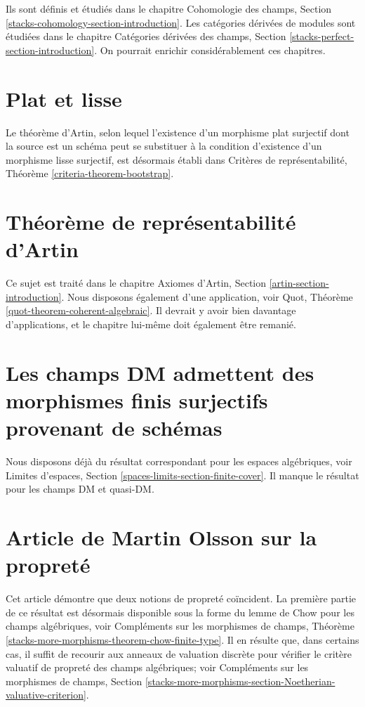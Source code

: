 \noindent
Ils sont définis et étudiés dans le chapitre
Cohomologie des champs, Section \ref{stacks-cohomology-section-introduction}.
Les catégories dérivées de modules sont étudiées dans le chapitre
Catégories dérivées des champs, Section \ref{stacks-perfect-section-introduction}.
On pourrait enrichir considérablement ces chapitres.



\section{Plat et lisse}
\label{section-flat-smooth}

\noindent
Le théorème d'Artin, selon lequel l'existence d'un morphisme plat surjectif dont la source est un schéma
peut se substituer à la condition d'existence d'un morphisme lisse surjectif, est désormais établi dans
Critères de représentabilité, Théorème \ref{criteria-theorem-bootstrap}.


\section{Théorème de représentabilité d'Artin}
\label{section-representability}

\noindent
Ce sujet est traité dans le chapitre
Axiomes d'Artin, Section \ref{artin-section-introduction}.
Nous disposons également d'une application, voir
Quot, Théorème \ref{quot-theorem-coherent-algebraic}.
Il devrait y avoir bien davantage d'applications, et le chapitre
lui-même doit également être remanié.


\section{Les champs DM admettent des morphismes finis surjectifs provenant de schémas}
\label{section-dm-finite-cover}

\noindent
Nous disposons déjà du résultat correspondant pour les espaces algébriques, voir
Limites d'espaces, Section \ref{spaces-limits-section-finite-cover}.
Il manque le résultat pour les champs DM et quasi-DM.


\section{Article de Martin Olsson sur la propreté}
\label{section-proper-parametrization}

\noindent
Cet article démontre que deux notions de propreté coïncident. La première partie de ce résultat
est désormais disponible sous la forme du lemme de Chow pour les champs algébriques, voir
Compléments sur les morphismes de champs, Théorème
\ref{stacks-more-morphisms-theorem-chow-finite-type}.
Il en résulte que, dans certains cas, il suffit de recourir aux anneaux de valuation discrète
pour vérifier le critère valuatif de propreté
des champs algébriques; voir
Compléments sur les morphismes de champs, Section
\ref{stacks-more-morphisms-section-Noetherian-valuative-criterion}.


